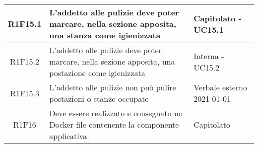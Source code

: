 \begin{center}
\begin{longtable}{|c|p{10cm}|p{4cm}|}
					\hline
R1F15.1&L'addetto alle pulizie deve poter marcare, nella sezione apposita, una stanza come igienizzata	& Capitolato - UC15.1	\\
						\hline
			R1F15.2&L'addetto alle pulizie deve poter marcare, nella sezione apposita, una postazione come igienizzata	&Interna - UC15.2 	\\
					\hline
			R1F15.3&L'addetto alle pulizie non può pulire postazioni o stanze occupate	& Verbale esterno 2021-01-01	\\
					\hline
					R1F16 &Deve essere realizzato e consegnato un Docker file
					contenente la componente applicativa. & Capitolato\\
					\hline
						
	\end{longtable}
\end{center}
